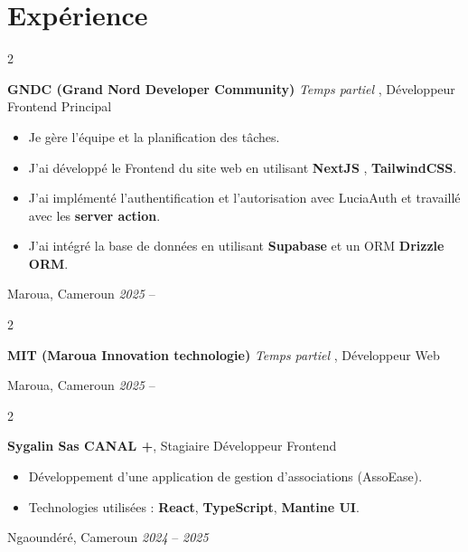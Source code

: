 \documentclass[10pt, letterpaper]{article}
\newenvironment{highlights}{
	\begin{itemize}[
		topsep=0.10 cm,
		parsep=0.10 cm,
		partopsep=0pt,
		itemsep=0pt,
		leftmargin=0.4 cm + 10pt
		]
	}{
	\end{itemize}
} %
\newenvironment{twocolentry}[2][]{
	\onecolentry
	\def\secondColumn{#2}
	\setcolumnwidth{\fill, 4.5 cm} %
	\begin{paracol}{2}
	}{
		\switchcolumn \raggedleft \secondColumn
	\end{paracol}
	\endonecolentry
} %
\begin{document}
	\section{Expérience}
	\begin{twocolentry}{Maroua, Cameroun \textit{2025} – }
		\textbf{GNDC (Grand Nord Developer Community)} \textit{Temps partiel} , Développeur Frontend Principal
		\begin{highlights}
			\item Je gère l'équipe et la planification des tâches.
			\item J'ai développé le Frontend du site web en utilisant \textbf{NextJS} , \textbf{TailwindCSS}.
			\item J'ai implémenté l'authentification et l'autorisation avec LuciaAuth et travaillé avec les \textbf{server action}.
			\item J'ai intégré la base de données en utilisant \textbf{Supabase} et un ORM \textbf{Drizzle ORM}.
		\end{highlights}
	\end{twocolentry}
	\begin{twocolentry}{Maroua, Cameroun \textit{2025} – }
		\textbf{MIT (Maroua Innovation technologie)} \textit{Temps partiel} , Développeur Web
	\end{twocolentry}
	\vspace{0.2 cm}
	\begin{twocolentry}{Ngaoundéré, Cameroun \textit{2024} – \textit{2025}}
		\textbf{Sygalin Sas CANAL +}, Stagiaire Développeur Frontend
		\begin{highlights}
			\item Développement d'une application de gestion d'associations (AssoEase).
			\item Technologies utilisées : \textbf{React}, \textbf{TypeScript}, \textbf{Mantine UI}.
		\end{highlights}
	\end{twocolentry}
\end{document}
